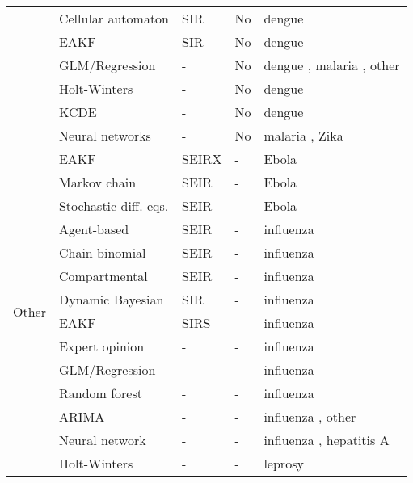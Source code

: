 \documentclass[a4paper]{article}
\begin{document}
\begin{table}[htp]
\begin{center}
\begin{tabular}{l|l|p{1cm}|p{1.8cm}|l}
 & Cellular automaton & SIR & No & dengue \cite{Gerardi2011} \\
 & EAKF & SIR & No & dengue \cite{yamana2016superensemble} \\
 & GLM/Regression & - & No & dengue \cite{lauer2018prospective,Hii2012,lowe2014dengue,Reich2016a}, malaria \cite{Sewe2017}, other \cite{Haemig2011,Liu2014,Moore2012}  \\
 & Holt-Winters & - & No & dengue \cite{buczak2018ensemble} \\
 & KCDE & - & No & dengue \cite{Ray2017} \\
 & Neural networks & - & No & malaria \cite{Thakur2019}, Zika \cite{akhtar2018dynamic} \\
 \hline
\multirow{14}{*}{Other} 
 & EAKF & SEIRX & - & Ebola \cite{Shaman2014} \\
 & Markov chain & SEIR & - & Ebola \cite{gaffey2017application} \\
 & Stochastic diff. eqs. & SEIR & - & Ebola \cite{funk2016real, asher2018forecasting} \\
 & Agent-based & SEIR & - & influenza \cite{Hyder2013,Nsoesie2013} \\
 & Chain binomial & SEIR & - & influenza \cite{Nishiura2011} \\
 & Compartmental & SEIR & - & influenza \cite{Birrell2011} \\
 & Dynamic Bayesian & SIR & - & influenza \cite{osthus2017forecasting,Osthus2019} \\
 & EAKF & SIRS & - &  influenza \cite{Shaman2012,pei2017counteracting} \\
 & Expert opinion & - & - & influenza \cite{farrow2017human} \\
 & GLM/Regression & - & - & influenza \cite{Held2012,Goldstein2011} \\
 & Random forest & - & - & influenza \cite{Kane2014} \\
 & ARIMA & - & - & influenza \cite{Dugas2013}, other \cite{Yan2010,Lu2010} \\
 & Neural network & - & - & influenza \cite{xu2017forecasting}, hepatitis A  \cite{guan2004forecasting} \\
 & Holt-Winters & - & - & leprosy \cite{deiner2017short} \\
 \hline
\end{tabular}
\end{center}
\label{tab:methods}
\end{table}%
\end{document}
